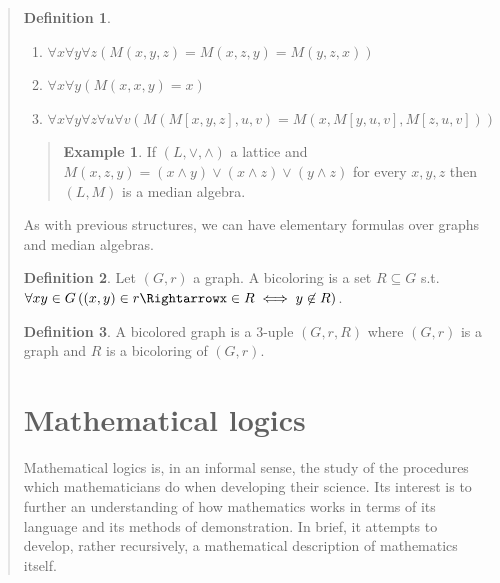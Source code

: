 \documentclass[a4paper, 12pt]{article}
\theoremstyle{definition}
\theoremstyle{definition}
\newtheorem{example}{Example}
\theoremstyle{definition}
\newtheorem{definition}{Definition}
\begin{document}
\begin{quote}
\begin{definition}
    \begin{enumerate}
        \item $\forall x \forall y \forall z \left( M(x, y, z) = M(x, z, y) = M(y, z, x) \right) $
        \item $\forall x \forall y \left( M(x, x, y) = x \right) $
        \item $\forall x \forall y \forall z \forall u \forall v \left( M \left( M \left[ x, y, z \right], u, v  \right) = M\left( x, M \left[ y, u, v \right], M\left[ z, u, v \right]   \right)   \right) $
    \end{enumerate}
\end{definition}


\small
\begin{quote}


\begin{example}
    If $(L, \lor, \land)$ a lattice and $M(x, z, y) = (x \land  y) \lor (x \land  z) \lor  (y \land  z)$ for every 
    $x,y,z$ then $(L, M)$ is a median algebra.
\end{example}

\end{quote}
\normalsize

As with previous structures, we can have elementary formulas over graphs and median algebras.

\begin{definition}
    Let $(G, r)$ a graph. A bicoloring is a set $R \subseteq G$  s.t. $\forall x y \in G \left( (x, y) \in r \Rightarrowx\in R \iff y \not\in R \right) $.
\end{definition}

\begin{definition}
    A bicolored graph is a $3$-uple $(G, r, R)$ where $(G, r)$ is a graph and $R$ is a bicoloring of 
    $(G, r)$.
\end{definition}

\pagebreak 

\section{Mathematical logics}

Mathematical logics is, in an informal sense, the study of the procedures which
mathematicians do when developing their science. Its interest is to further an
understanding of how mathematics works in terms of its language and its methods
of demonstration. In brief, it attempts to develop, rather recursively, a
mathematical description of mathematics itself.


\end{quote}
\end{document}
